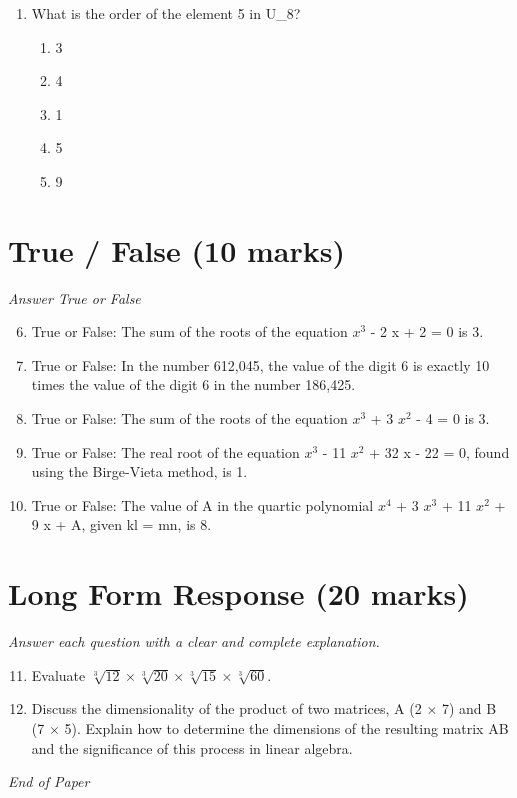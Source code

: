 \documentclass[12pt]{article}
\begin{document}
\begin{enumerate}[label=\arabic*.]
\begin{enumerate}[label=(\alph*)]
    \item 0.6931471
    \item 3.7320508
    \item 2.3025851
    \item 6.2831853
    \item 1.4142135
\end{enumerate}
\item What is the order of the element 5 in U\_8?
\begin{enumerate}[label=(\alph*)]
    \item 3
    \item 4
    \item 1
    \item 5
    \item 9
\end{enumerate}
\end{enumerate}

\section*{True / False (10 marks)}
\textit{Answer True or False}
\begin{enumerate}[label=\arabic*.]
\setcounter{enumi}{5}
\item True or False: The sum of the roots of the equation $x^3$ - 2 x + 2 = 0 is 3.
\item True or False: In the number 612,045, the value of the digit 6 is exactly 10 times the value of the digit 6 in the number 186,425.
\item True or False: The sum of the roots of the equation $x^3$ + 3 $x^2$ - 4 = 0 is 3.
\item True or False: The real root of the equation $x^3$ - 11 $x^2$ + 32 x - 22 = 0, found using the Birge-Vieta method, is 1.
\item True or False: The value of A in the quartic polynomial $x^4$ + 3 $x^3$ + 11 $x^2$ + 9 x + A, given kl = mn, is 8.
\end{enumerate}

\section*{Long Form Response (20 marks)}
\textit{Answer each question with a clear and complete explanation.}
\begin{enumerate}[label=\arabic*.]
\setcounter{enumi}{10}
\item Evaluate $\sqrt[3]{12}\times \sqrt[3]{20}\times \sqrt[3]{15}\times \sqrt[3]{60}$.
\item Discuss the dimensionality of the product of two matrices, A (2 \ensuremath{\times} 7) and B (7 \ensuremath{\times} 5). Explain how to determine the dimensions of the resulting matrix AB and the significance of this process in linear algebra.
\end{enumerate}

\vfill
\noindent\textit{End of Paper}
\end{document}
